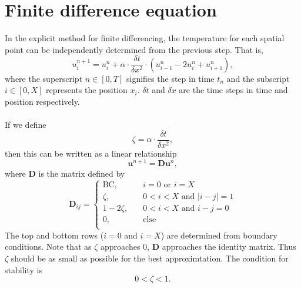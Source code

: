 \documentclass[letterpaper,titlepage,oneside]{report}
\begin{document}
\section*{Finite difference equation}
In the explicit method for finite differencing, the temperature for
each spatial point can be independently determined from the previous
step. That is,
\begin{equation}\label{eq:explicit}
  u_i^{n+1} = u_i^n + \alpha\cdot\frac{\delta t}{\delta x^2}\cdot
  \left(u_{i-1}^n - 2u_i^n + u_{i+1}^n\right),
\end{equation}
where the superscript $n \in [0, T]$ signifies the step in time
$t_n$ and the
subscript $i \in [0, X]$ represents the position
$x_i$. $\delta t$ and $\delta x$
are the time steps in time and position respectively.
\\\\
If we define
\begin{equation*}
  \zeta = \alpha\cdot\frac{\delta t}{\delta x^2},
\end{equation*}
then this can be written as a linear relationship
\begin{equation}\label{eq:explicitlinear}
  \mathbf{u}^{n+1} = \mathbf{D}\mathbf{u}^{n},
\end{equation}
where $\mathbf{D}$ is the matrix defined by
\begin{equation}\label{eq:explicitdmatrix}
  \mathbf{D}_{ij} = 
  \begin{cases}
    \text{BC}, & \quad i=0 \text{ or } i=X \\
    \zeta,     & \quad 0<i<X \text{ and } |i-j|=1 \\
    1-2\zeta,  & \quad 0<i<X \text{ and } i-j=0 \\
    0,         & \quad \text{else} \\
  \end{cases}
\end{equation}
The top and bottom rows ($i=0$ and $i=X$) are determined from
boundary conditions. Note that as $\zeta$ approaches $0$,
$\mathbf{D}$ approaches the identity matrix. Thus $\zeta$ should be
as small as possible for the best approximtation. The condition for
stability is
\begin{equation}\label{eq:stability}
  0<\zeta<1.
\end{equation}
\end{document}
